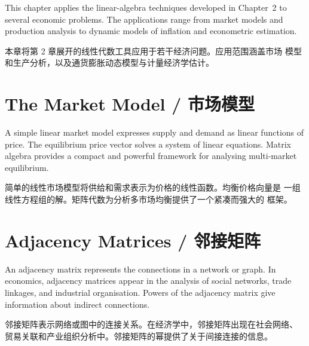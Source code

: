 \begin{original}
This chapter applies the linear-algebra techniques developed in
Chapter~2 to several economic problems.  The applications range from
market models and production analysis to dynamic models of inflation
and econometric estimation.
\end{original}
\begin{translation}
本章将第 2 章展开的线性代数工具应用于若干经济问题。应用范围涵盖市场
模型和生产分析，以及通货膨胀动态模型与计量经济学估计。
\end{translation}

\section{The Market Model / 市场模型}

\begin{original}
A simple linear market model expresses supply and demand as linear
functions of price.  The equilibrium price vector solves a system of
linear equations.  Matrix algebra provides a compact and powerful
framework for analysing multi-market equilibrium.
\end{original}
\begin{translation}
简单的线性市场模型将供给和需求表示为价格的线性函数。均衡价格向量是
一组线性方程组的解。矩阵代数为分析多市场均衡提供了一个紧凑而强大的
框架。
\end{translation}

\section{Adjacency Matrices / 邻接矩阵}

\begin{original}
An adjacency matrix represents the connections in a network or graph.
In economics, adjacency matrices appear in the analysis of social
networks, trade linkages, and industrial organisation.  Powers of the
adjacency matrix give information about indirect connections.
\end{original}
\begin{translation}
邻接矩阵表示网络或图中的连接关系。在经济学中，邻接矩阵出现在社会网络、
贸易关联和产业组织分析中。邻接矩阵的幂提供了关于间接连接的信息。
\end{translation}

